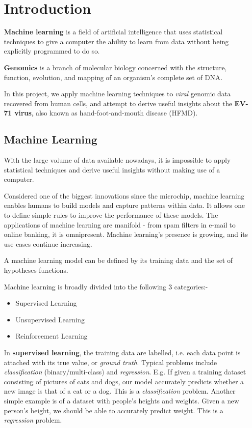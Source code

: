 \clearpage
\section{Introduction}
\label{sec:Intro}

\textbf{Machine learning} is a field of artificial intelligence that uses statistical techniques to give a computer the ability to learn from data without being explicitly programmed to do so. 

\textbf{Genomics} is a branch of molecular biology concerned with the structure, function, evolution, and mapping of an organism's complete set of DNA.

In this project, we apply machine learning techniques to \textit{viral} genomic data recovered from human cells, and attempt to derive useful insights about the \textbf{EV-71 virus}, also known as hand-foot-and-mouth disease (HFMD).

\subsection{Machine Learning}

With the large volume of data available nowadays, it is impossible to apply statistical techniques and derive useful insights without making use of a computer. 

Considered one of the biggest innovations since the microchip, machine learning enables humans to build models and capture patterns within data. It allows one to define simple rules to improve the performance of these models. The applications of machine learning are manifold - from spam filters in e-mail to online banking, it is omnipresent. Machine learning's presence is growing, and its use cases continue increasing.

A machine learning model can be defined by its training data and the set of hypotheses functions.

Machine learning is broadly divided into the following 3 categories:-
\begin{itemize}
    \item Supervised Learning
    \item Unsupervised Learning
    \item Reinforcement Learning
\end{itemize}

In \textbf{supervised learning}, the training data are labelled, i.e. each data point is attached with its true value, or \textit{ground truth}. Typical problems include \textit{classification} (binary/multi-class) and \textit{regression}. E.g. If given a training dataset consisting of pictures of cats and dogs, our model accurately predicts whether a new image is that of a cat or a dog. This is a \textit{classification} problem. Another simple example is of a dataset with people's heights and weights. Given a new person's height, we should be able to accurately predict weight. This is a \textit{regression} problem.

